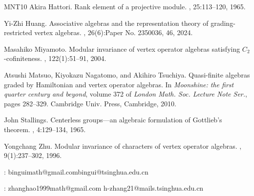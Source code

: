 \documentclass[11pt,b5paper,notitlepage]{article}
\theoremstyle{definition}
\theoremstyle{plain}
\numberwithin{equation}{section}
\begin{document}
\begin{thebibliography}{MNT10}
Akira Hattori.
\newblock Rank element of a projective module.
, 25:113--120, 1965.

Yi-Zhi Huang.
\newblock Associative algebras and the representation theory of
  grading-restricted vertex algebras.
, 26(6):Paper No. 2350036, 46, 2024.

Masahiko Miyamoto.
\newblock Modular invariance of vertex operator algebras satisfying
  {$C_2$}-cofiniteness.
, 122(1):51--91, 2004.

Atsushi Matsuo, Kiyokazu Nagatomo, and Akihiro Tsuchiya.
\newblock Quasi-finite algebras graded by {H}amiltonian and vertex operator
  algebras.
\newblock In {\em Moonshine: the first quarter century and beyond}, volume 372
  of {\em London Math. Soc. Lecture Note Ser.}, pages 282--329. Cambridge Univ.
  Press, Cambridge, 2010.

John Stallings.
\newblock Centerless groups---an algebraic formulation of {G}ottlieb's theorem.
, 4:129--134, 1965.

Yongchang Zhu.
\newblock Modular invariance of characters of vertex operator algebras.
, 9(1):237--302, 1996.

\end{thebibliography}


: binguimath@gmail.com\qquad bingui@tsinghua.edu.cn\\


: zhanghao1999math@gmail.com \qquad h-zhang21@mails.tsinghua.edu.cn
\end{document}
